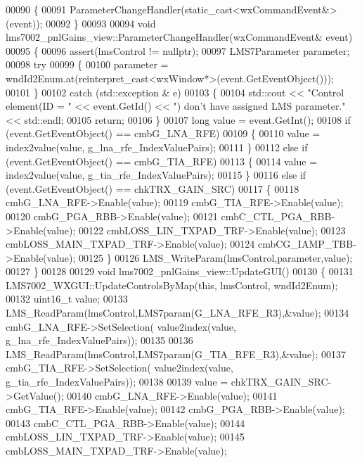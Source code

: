 \begin{DoxyCode}
{{00090 \{
00091     ParameterChangeHandler(static\_cast<wxCommandEvent&>(event));
00092 \}
00093 
00094 \textcolor{keywordtype}{void} lms7002_pnlGains_view::ParameterChangeHandler(wxCommandEvent& event)
00095 \{
00096     assert(lmsControl != \textcolor{keyword}{nullptr});
00097     LMS7Parameter parameter;
00098     \textcolor{keywordflow}{try}
00099     \{
00100         parameter = wndId2Enum.at(reinterpret\_cast<wxWindow*>(event.GetEventObject()));
00101     \}
00102     \textcolor{keywordflow}{catch} (std::exception & e)
00103     \{
00104         std::cout << \textcolor{stringliteral}{"Control element(ID = "} << \textcolor{keyword}{event}.GetId() << \textcolor{stringliteral}{") don't have assigned LMS parameter."} << 
      std::endl;
00105         \textcolor{keywordflow}{return};
00106     \}
00107     \textcolor{keywordtype}{long} value = \textcolor{keyword}{event}.GetInt();
00108     \textcolor{keywordflow}{if} (event.GetEventObject() == cmbG_LNA_RFE)
00109     \{
00110         value = index2value(value, g_lna_rfe_IndexValuePairs);
00111     \}
00112     \textcolor{keywordflow}{else} \textcolor{keywordflow}{if} (event.GetEventObject() == cmbG_TIA_RFE)
00113     \{
00114         value = index2value(value, g_tia_rfe_IndexValuePairs);
00115     \}
00116     \textcolor{keywordflow}{else} \textcolor{keywordflow}{if} (event.GetEventObject() == chkTRX_GAIN_SRC)
00117     \{
00118         cmbG_LNA_RFE->Enable(value);
00119         cmbG_TIA_RFE->Enable(value);
00120         cmbG_PGA_RBB->Enable(value);
00121         cmbC_CTL_PGA_RBB->Enable(value);
00122         cmbLOSS_LIN_TXPAD_TRF->Enable(value);
00123         cmbLOSS_MAIN_TXPAD_TRF->Enable(value);
00124         cmbCG_IAMP_TBB->Enable(value);
00125     \}
00126     LMS_WriteParam(lmsControl,parameter,value);
00127 \}
00128 
00129 \textcolor{keywordtype}{void} lms7002_pnlGains_view::UpdateGUI()
00130 \{
00131     LMS7002_WXGUI::UpdateControlsByMap(\textcolor{keyword}{this}, lmsControl, wndId2Enum);
00132     uint16\_t value;
00133     LMS_ReadParam(lmsControl,LMS7param(G_LNA_RFE_R3),&value);
00134     cmbG_LNA_RFE->SetSelection( value2index(value, g_lna_rfe_IndexValuePairs));
00135 
00136     LMS_ReadParam(lmsControl,LMS7param(G_TIA_RFE_R3),&value);
00137     cmbG_TIA_RFE->SetSelection( value2index(value, g_tia_rfe_IndexValuePairs));
00138 
00139     value = chkTRX_GAIN_SRC->GetValue();
00140     cmbG_LNA_RFE->Enable(value);
00141     cmbG_TIA_RFE->Enable(value);
00142     cmbG_PGA_RBB->Enable(value);
00143     cmbC_CTL_PGA_RBB->Enable(value);
00144     cmbLOSS_LIN_TXPAD_TRF->Enable(value);
00145     cmbLOSS_MAIN_TXPAD_TRF->Enable(value);
}}
\end{DoxyCode}
